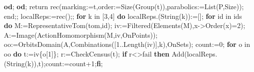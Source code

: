 \documentclass[
  10pt,
  letterpaper,
]{article}
\newenvironment{Shaded}{}{}
\newcommand{\BuiltInTok}[1]{\textcolor[rgb]{0.00,0.50,0.00}{#1}}
\newcommand{\ConstantTok}[1]{\textcolor[rgb]{0.53,0.00,0.00}{#1}}
\newcommand{\ControlFlowTok}[1]{\textcolor[rgb]{0.00,0.44,0.13}{\textbf{#1}}}
\newcommand{\ExtensionTok}[1]{#1}
\newcommand{\FloatTok}[1]{\textcolor[rgb]{0.25,0.63,0.44}{#1}}
\newcommand{\FunctionTok}[1]{\textcolor[rgb]{0.02,0.16,0.49}{#1}}
\newcommand{\NormalTok}[1]{#1}
\newcommand{\OperatorTok}[1]{\textcolor[rgb]{0.40,0.40,0.40}{#1}}
\newcommand{\VariableTok}[1]{\textcolor[rgb]{0.10,0.09,0.49}{#1}}
\begin{document}
\begin{Shaded}
\begin{Highlighting}[]
  \ControlFlowTok{od}\OperatorTok{;}
 \ControlFlowTok{od}\OperatorTok{;}
 \ExtensionTok{return} \ExtensionTok{rec}\NormalTok{(}\VariableTok{marking}\OperatorTok{:=}\VariableTok{t}\OperatorTok{,}\VariableTok{order}\OperatorTok{:=}\BuiltInTok{Size}\NormalTok{(}\BuiltInTok{Group}\NormalTok{(}\VariableTok{t}\NormalTok{))}\OperatorTok{,}\VariableTok{parabolics}\OperatorTok{:=}\BuiltInTok{List}\NormalTok{(}\VariableTok{P}\OperatorTok{,}\BuiltInTok{Size}\NormalTok{))}\OperatorTok{;}
\FunctionTok{end}\OperatorTok{;;}
\VariableTok{localReps}\OperatorTok{:=}\ExtensionTok{rec}\NormalTok{()}\OperatorTok{;;}
\ControlFlowTok{for} \VariableTok{k} \ExtensionTok{in}\NormalTok{ [}\FloatTok{3}\OperatorTok{,}\FloatTok{4}\NormalTok{] }\ControlFlowTok{do}
 \VariableTok{localReps}\NormalTok{.(}\BuiltInTok{String}\NormalTok{(}\VariableTok{k}\NormalTok{))}\OperatorTok{:=}\NormalTok{[]}\OperatorTok{;}
 \ControlFlowTok{for} \VariableTok{id} \ExtensionTok{in} \VariableTok{ids} \ControlFlowTok{do}
  \VariableTok{M}\OperatorTok{:=}\BuiltInTok{RepresentativeTom}\NormalTok{(}\VariableTok{tom}\OperatorTok{,}\VariableTok{id}\NormalTok{)}\OperatorTok{;}
  \VariableTok{iv}\OperatorTok{:=}\BuiltInTok{Filtered}\NormalTok{(}\BuiltInTok{Elements}\NormalTok{(}\VariableTok{M}\NormalTok{)}\OperatorTok{,}\VariableTok{x}\OperatorTok{{-}\textgreater{}}\BuiltInTok{Order}\NormalTok{(}\VariableTok{x}\NormalTok{)}\OperatorTok{=}\FloatTok{2}\NormalTok{)}\OperatorTok{;}
  \VariableTok{A}\OperatorTok{:=}\BuiltInTok{Image}\NormalTok{(}\BuiltInTok{ActionHomomorphism}\NormalTok{(}\VariableTok{M}\OperatorTok{,}\VariableTok{iv}\OperatorTok{,}\BuiltInTok{OnPoints}\NormalTok{))}\OperatorTok{;}
  \VariableTok{oo}\OperatorTok{:=}\BuiltInTok{OrbitsDomain}\NormalTok{(}\VariableTok{A}\OperatorTok{,}\BuiltInTok{Combinations}\NormalTok{([}\FloatTok{1}\OperatorTok{..}\BuiltInTok{Length}\NormalTok{(}\VariableTok{iv}\NormalTok{)]}\OperatorTok{,}\VariableTok{k}\NormalTok{)}\OperatorTok{,}\BuiltInTok{OnSets}\NormalTok{)}\OperatorTok{;}
  \VariableTok{count}\OperatorTok{:=}\FloatTok{0}\OperatorTok{;}
  \ControlFlowTok{for} \VariableTok{o} \ExtensionTok{in} \VariableTok{oo} \ControlFlowTok{do}
   \VariableTok{t}\OperatorTok{:=}\VariableTok{iv}\NormalTok{\{}\VariableTok{o}\NormalTok{[}\FloatTok{1}\NormalTok{]\}}\OperatorTok{;} \VariableTok{r}\OperatorTok{:=}\VariableTok{CheckCensus}\NormalTok{(}\VariableTok{t}\NormalTok{)}\OperatorTok{;}
   \ControlFlowTok{if} \VariableTok{r}\OperatorTok{\textless{}\textgreater{}}\ConstantTok{fail} \ControlFlowTok{then} \BuiltInTok{Add}\NormalTok{(}\VariableTok{localReps}\NormalTok{.(}\BuiltInTok{String}\NormalTok{(}\VariableTok{k}\NormalTok{))}\OperatorTok{,}\VariableTok{t}\NormalTok{)}\OperatorTok{;}\VariableTok{count}\OperatorTok{:=}\VariableTok{count}\OperatorTok{+}\FloatTok{1}\OperatorTok{;}\ControlFlowTok{fi}\OperatorTok{;}

\end{Highlighting}
\end{Shaded}
\end{document}
